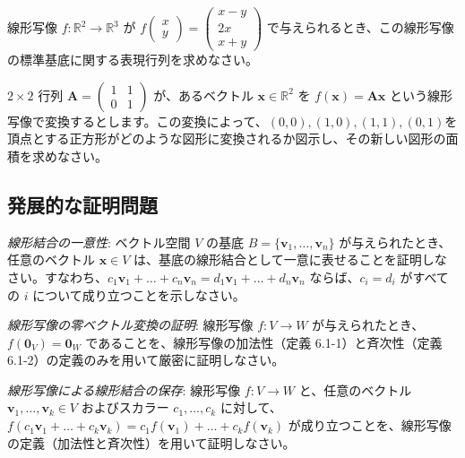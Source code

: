\begin{quiz}
線形写像 $f: \mathbb{R}^2 \to \mathbb{R}^3$ が $f\begin{pmatrix} x \\ y \end{pmatrix} = \begin{pmatrix} x-y \\ 2x \\ x+y \end{pmatrix}$ で与えられるとき、この線形写像の標準基底に関する表現行列を求めなさい。
\end{quiz}

\begin{quiz}
$2 \times 2$ 行列 $\bm{A} = \begin{pmatrix} 1 & 1 \\ 0 & 1 \end{pmatrix}$ が、あるベクトル $\bm{x} \in \mathbb{R}^2$ を $f(\bm{x}) = \bm{A}\bm{x}$ という線形写像で変換するとします。この変換によって、$(0,0),(1,0),(1,1),(0,1)$を頂点とする正方形がどのような図形に変換されるか図示し、その新しい図形の面積を求めなさい。
\end{quiz}

\subsection{発展的な証明問題}

\begin{quiz} \label{uniqueness_of_linear_combination}
\emph{線形結合の一意性}: ベクトル空間 $V$ の基底 $B = \{\bm{v}_1, \ldots, \bm{v}_n\}$ が与えられたとき、任意のベクトル $\bm{x} \in V$ は、基底の線形結合として一意に表せることを証明しなさい。すなわち、$c_1\bm{v}_1 + \dots + c_n\bm{v}_n = d_1\bm{v}_1 + \dots + d_n\bm{v}_n$ ならば、$c_i = d_i$ がすべての $i$ について成り立つことを示しなさい。
\end{quiz}

\begin{quiz}
\emph{線形写像の零ベクトル変換の証明}: 線形写像 $f:V \to W$ が与えられたとき、$f(\bm{0}_V) = \bm{0}_W$ であることを、線形写像の加法性（定義 6.1-1）と斉次性（定義 6.1-2）の定義のみを用いて厳密に証明しなさい。
\end{quiz}

\begin{quiz}
\emph{線形写像による線形結合の保存}: 線形写像 $f:V \to W$ と、任意のベクトル $\bm{v}_1, \ldots, \bm{v}_k \in V$ およびスカラー $c_1, \ldots, c_k$ に対して、$f(c_1\bm{v}_1 + \dots + c_k\bm{v}_k) = c_1 f(\bm{v}_1) + \dots + c_k f(\bm{v}_k)$ が成り立つことを、線形写像の定義（加法性と斉次性）を用いて証明しなさい。
\end{quiz}

